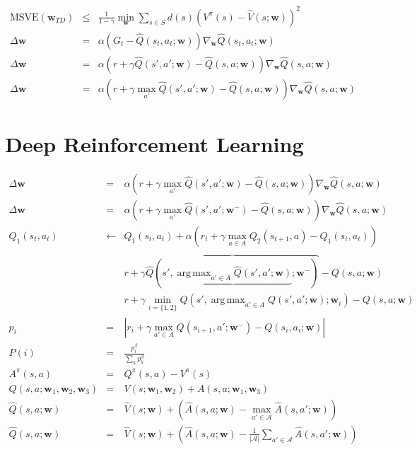 \documentclass[]{article}
\DeclareMathOperator*{\argmax}{arg\,max}
\newcommand{\vect}[1]{\mathbf{#1}}
\begin{document}
\begin{eqnarray}
    \text{MSVE}(\vect{w}_{TD}) &\leq& \frac{1}{1-\gamma} \min_\vect{w}\sum_{s\in S} d(s) (V^\pi(s) - \hat{V}(s;\vect{w}))^2\\
    \Delta \vect{w} &=& \alpha(G_t - \hat{Q}(s_t,a_t; \vect{w})) \nabla_{\vect{w}} \hat{Q}(s_t, a_t; \vect{w})\\
    \Delta \vect{w} &=& \alpha (r + \gamma \hat{Q}(s',a';\vect{w}) - \hat{Q}(s,a;\vect{w})) \nabla_{\vect{w}}\hat{Q}(s,a;\vect{w}) \\
    \Delta \vect{w} &=& \alpha (r + \gamma \max_{a'} \hat{Q}(s',a';\vect{w}) - \hat{Q}(s,a;\vect{w})) \nabla_{\vect{w}}\hat{Q}(s,a;\vect{w}) 
\end{eqnarray}

\section{Deep Reinforcement Learning}

\begin{eqnarray}
    \Delta \vect{w} &=& \alpha (r + \gamma \max_{a'} \hat{Q}(s',a';\vect{w}) - \hat{Q}(s,a;\vect{w})) \nabla_{\vect{w}}\hat{Q}(s,a;\vect{w})\\
    \Delta \vect{w} &=& \alpha (r + \gamma \max_{a'} \hat{Q}(s',a';\vect{w}^-) - \hat{Q}(s,a;\vect{w})) \nabla_{\vect{w}}\hat{Q}(s,a;\vect{w})\\
    Q_1(s_t, a_t) &\gets& Q_1(s_t, a_t) + \alpha (r_t +\gamma \max_{a\in A} Q_2(s_{t+1}, a) - Q_1(s_t, a_t))\\
    &&r + \gamma \overbrace{\hat{Q}(s', \underbrace{\argmax_{a' \in A} \hat{Q}(s',a';\vect{w})}_{};\vect{w}^-)}^{} - Q(s,a;\vect{w})\\
    &&r + \gamma \min_{i=\{1,2\}}Q(s', \argmax_{a' \in A} Q(s', a'; \vect{w}); \vect{w}_i) - Q(s,a;\vect{w})\\
    p_i &=& | r_i + \gamma \max_{a' \in A} Q(s_{i+1}, a'; \vect{w}^-) - Q(s_i,a_i;\vect{w}) |\\
    P(i) &=& \frac{p_i^\beta}{\sum_k p_k^\beta}\\
    A^\pi (s,a) &=& Q^\pi(s,a) - V^\pi(s) \\
    Q(s,a;\vect{w}_1, \vect{w}_2, \vect{w}_3) &=& V(s;\vect{w}_1, \vect{w}_2) + A(s,a;\vect{w}_1, \vect{w}_3)\\
    \hat{Q}(s,a;\vect{w}) &=& \hat{V}(s;\vect{w}) + \left( \hat{A}(s,a;\vect{w}) - \max_{a' \in \mathcal{A}} \hat{A}(s,a';\vect{w}) \right) \\
    \hat{Q}(s,a;\vect{w}) &=& \hat{V}(s;\vect{w}) + \left( \hat{A}(s,a;\vect{w}) - \frac{1}{|\mathcal{A}|} \sum_{a' \in \mathcal{A}} \hat{A}(s,a';\vect{w}) \right)
\end{eqnarray}
\end{document}
